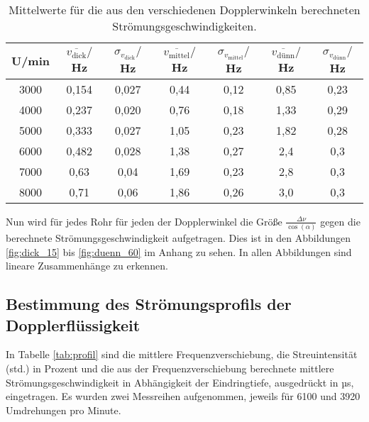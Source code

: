 \begin{table}[htp]
	\begin{center}
    \caption{Mittelwerte für die aus den verschiedenen Dopplerwinkeln berechneten
    Strömungsgeschwindigkeiten.}
    \label{tab:mittelwerte}
		\begin{tabular}{ccccccc}
		\toprule
			{U/min} & {$\overline{v_{{\text{dick}}}}/$Hz} & {$\sigma_{{v_{\text{dick}}}}/$Hz} &
      {$\overline{v_{\text{mittel}}}/$Hz} & {$\sigma_{{v_{\text{mittel}}}}/$Hz} &
      {$\overline{v_{\text{dünn}}}/$Hz} & {$\sigma_{{v_{\text{dünn}}}}/$Hz}\\
			\midrule
			3000 & 0,154 & 0,027 & 0,44 & 0,12 & 0,85 & 0,23\\
			4000 & 0,237 & 0,020 & 0,76 & 0,18 & 1,33 & 0,29\\
			5000 & 0,333 & 0,027 & 1,05 & 0,23 & 1,82 & 0,28\\
			6000 & 0,482 & 0,028 & 1,38 & 0,27 & 2,4 & 0,3\\
			7000 & 0,63  & 0,04 & 1,69 & 0,23 & 2,8 & 0,3\\
			8000 & 0,71  & 0,06 & 1,86 & 0,26 & 3,0 & 0,3\\
		\bottomrule
		\end{tabular}
	\end{center}
\end{table}

Nun wird für jedes Rohr für jeden der Dopplerwinkel die Größe $\frac{\Delta \nu}{\cos(\alpha)}$
gegen die berechnete Strömungsgeschwindigkeit aufgetragen. Dies ist in den Abbildungen
\ref{fig:dick_15} bis \ref{fig:duenn_60} im Anhang zu sehen. In allen Abbildungen sind
lineare Zusammenhänge zu erkennen.

\subsection{Bestimmung des Strömungsprofils der Dopplerflüssigkeit}
\label{subsec:strömungsprofil}

In Tabelle \ref{tab:profil} sind die mittlere Frequenzverschiebung,
die Streuintensität (std.) in Prozent und die aus der Frequenzverschiebung
berechnete mittlere Strömungsgeschwindigkeit in Abhängigkeit der Eindringtiefe,
ausgedrückt in µs, eingetragen. Es wurden zwei Messreihen aufgenommen, jeweils für
6100 und 3920 Umdrehungen pro Minute.

